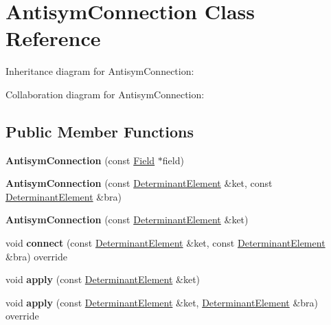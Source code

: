 \hypertarget{classAntisymConnection}{}\section{Antisym\+Connection Class Reference}
\label{classAntisymConnection}


Inheritance diagram for Antisym\+Connection\+:


Collaboration diagram for Antisym\+Connection\+:
\subsection*{Public Member Functions}
\begin{DoxyCompactItemize}
\item 
{\bfseries Antisym\+Connection} (const \hyperlink{classField}{Field} $\ast$field)\hypertarget{classAntisymConnection_aaee6b6954a7a024a68f648652447f6b0}{}\label{classAntisymConnection_aaee6b6954a7a024a68f648652447f6b0}

\item 
{\bfseries Antisym\+Connection} (const \hyperlink{classDeterminantElement}{Determinant\+Element} \&ket, const \hyperlink{classDeterminantElement}{Determinant\+Element} \&bra)\hypertarget{classAntisymConnection_ac340ada066d7220944961e6fd815419e}{}\label{classAntisymConnection_ac340ada066d7220944961e6fd815419e}

\item 
{\bfseries Antisym\+Connection} (const \hyperlink{classDeterminantElement}{Determinant\+Element} \&ket)\hypertarget{classAntisymConnection_a4efe834c774fe0537dd85fa83801dd18}{}\label{classAntisymConnection_a4efe834c774fe0537dd85fa83801dd18}

\item 
void {\bfseries connect} (const \hyperlink{classDeterminantElement}{Determinant\+Element} \&ket, const \hyperlink{classDeterminantElement}{Determinant\+Element} \&bra) override\hypertarget{classAntisymConnection_a6c4fac9e367a748774108d4da5d8f3f8}{}\label{classAntisymConnection_a6c4fac9e367a748774108d4da5d8f3f8}

\item 
void {\bfseries apply} (const \hyperlink{classDeterminantElement}{Determinant\+Element} \&ket)\hypertarget{classAntisymConnection_a0eb1b8853be6cd73b8f1d6b488915c1b}{}\label{classAntisymConnection_a0eb1b8853be6cd73b8f1d6b488915c1b}

\item 
void {\bfseries apply} (const \hyperlink{classDeterminantElement}{Determinant\+Element} \&ket, \hyperlink{classDeterminantElement}{Determinant\+Element} \&bra) override\hypertarget{classAntisymConnection_a987a278b67158864215ef48f7d17f3e8}{}\label{classAntisymConnection_a987a278b67158864215ef48f7d17f3e8}


\end{DoxyCompactItemize}

